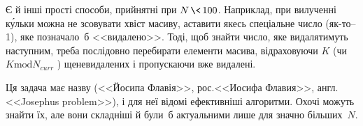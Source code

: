 Є й інші %
прості способи, прийнятні при ${%
N\,{\<}\,100}$. Наприклад, при вилученні к\'{у}льки можна не зсовувати хвіст масиву, а\nolinebreak[3] ставити якесь спеціальне число (\mbox{як-то}\nolinebreak[3] \mbox{--1}), яке позначало~б <<видалено>>. Тоді, щоб знайти число, яке видалятимуть наступним, треба послідовно перебирати елементи масива, відраховуючи $K$ (чи\nolinebreak[3] $K\mathbin{\mathrm{mod}}N_{curr}$%
) ще\nolinebreak[3] не\nolinebreak[3] видалених і пропускаючи вже видалені.

Ця задача має назву (<<Йосипа Флавія>>, рос.\nolinebreak[3] <<Иосифа Флавия>>, англ.\nolinebreak[3] <<Josephus problem>>), і для неї відомі ефективніші алгоритми. Охочі можуть знайти їх, але вони складніші й були~б актуальними лише для значно більших~$N$.
